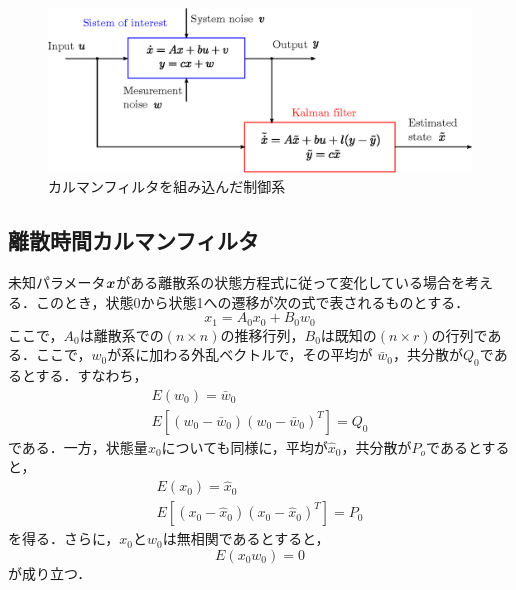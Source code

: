 \documentclass[a4paper,12pt]{jarticle}
\begin{document}
%
\begin{figure}[tb]
 \begin{center}
  \includegraphics[scale=0.8]{../figure/eps/kalman.eps}
  \caption{カルマンフィルタを組み込んだ制御系}
  \label{kalman}
 \end{center}
\end{figure}
%






\subsection{離散時間カルマンフィルタ}
%
未知パラメータ$ \mbox{\boldmath{$x$}} $がある離散系の状態方程式に従って変化している場合を考える．このとき，状態0から状態1への遷移が次の式で表されるものとする．
%
\begin{equation}
 x_1 = A_0 x_0 + B_0 w_0
\label{(1)}
\end{equation}
%
%
ここで，$ A_0 $は離散系での$ (n \times n) $の推移行列，$ B_0 $は既知の$ (n \times r) $の行列である．ここで，$ w_0 $が系に加わる外乱ベクトルで，その平均が $ \bar{w}_0 $，共分散が$ Q_0 $であるとする．すなわち，
%
\begin{eqnarray}
 E(w_0) = \bar{w}_0 \\
 E[ ( w_0 - \bar{w}_0 )( w_0 - \bar{w}_0 )^T ] = Q_0
\end{eqnarray}
%
である．一方，状態量$ x_0 $についても同様に，平均が$ \hat{x}_0 $，共分散が$ P_o $であるとすると，
%
\begin{eqnarray}
 E(x_0) = \hat{x}_0 \\
 E[ ( x_0 - \hat{x}_0 )( x_0 - \hat{x}_0 )^T ] = P_0
\end{eqnarray}
%
を得る．さらに，$ x_0 $と$ w_0 $は無相関であるとすると，
%
\begin{equation}
 E(x_0 w_0) = 0
\end{equation}
%
が成り立つ．
\end{document}
